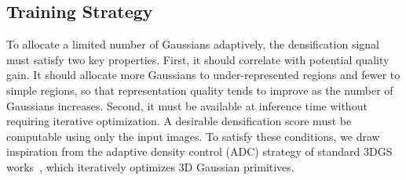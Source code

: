 \vspace{-3pt}
\subsection{Training Strategy}
\label{sec3.3:training_pipeline}
To allocate a limited number of Gaussians adaptively, the densification signal must satisfy two key properties. 
First, it should correlate with potential quality gain. It should allocate more Gaussians to under-represented regions and fewer to simple regions, so that representation quality tends to improve as the number of Gaussians increases.
Second, it must be available at inference time without requiring iterative optimization. A desirable densification score must be computable using only the input images. 
To satisfy these conditions, we draw inspiration from the adaptive density control (ADC) strategy of standard 3DGS works~\cite{kerbl20233dgs, ye2024absgs}, which iteratively optimizes 3D Gaussian primitives.



